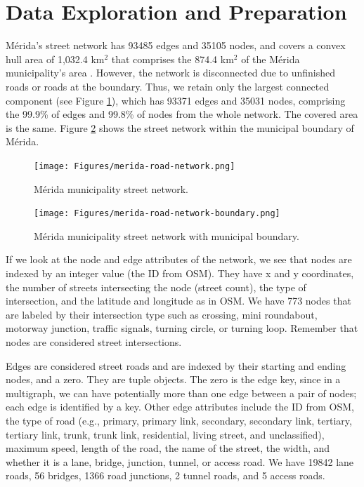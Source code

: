 \section{Data Exploration and Preparation}

Mérida's street network has 93485 edges and 35105 nodes, and covers a convex hull area of 1,032.4 km$^2$ that comprises the 874.4 km$^2$ of the Mérida municipality's area \cite{2020census}. However, the network is disconnected due to unfinished roads or roads at the boundary. Thus, we retain only the largest connected component (see Figure \ref{fig:merida-street-network}), which has 93371 edges and 35031 nodes, comprising the 99.9\% of edges and 99.8\% of nodes from the whole network. The covered area is the same. Figure \ref{fig:merida-street-network-boundary} shows the street network within the municipal boundary of Mérida. 

\begin{figure}[h!]
	\centering
	\texttt{[image: Figures/merida-road-network.png]}
	\caption{Mérida municipality street network.
		\label{fig:merida-street-network}}
\end{figure}

\begin{figure}[h!]
	\centering
	\texttt{[image: Figures/merida-road-network-boundary.png]}
	\caption{Mérida municipality street network with municipal boundary.
		\label{fig:merida-street-network-boundary}}
\end{figure}

If we look at the node and edge attributes of the network, we see that nodes are indexed by an integer value (the ID from OSM). They have x and y coordinates, the number of streets intersecting the node (street count), the type of intersection, and the latitude and longitude as in OSM. We have 773 nodes that are labeled by their intersection type such as crossing, mini roundabout, motorway junction, traffic signals, turning circle, or turning loop. Remember that nodes are considered street intersections.

Edges are considered street roads and are indexed by their starting and ending nodes, and a zero. They are tuple objects. The zero is the edge key, since in a multigraph, we can have potentially more than one edge between a pair of nodes; each edge is identified by a key. Other edge attributes include the ID from OSM, the type of road (e.g., primary, primary link, secondary, secondary link, tertiary, tertiary link, trunk, trunk link, residential, living street, and unclassified), maximum speed, length of the road, the name of the street, the width, and whether it is a lane, bridge, junction, tunnel, or access road. We have 19842 lane roads, 56 bridges, 1366 road junctions, 2 tunnel roads, and 5 access roads.

